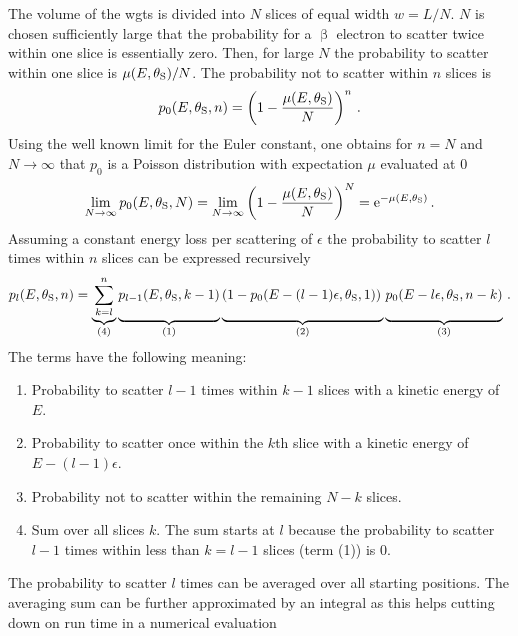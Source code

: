 The volume of the \gls{wgts} is divided into $N$ slices of equal width $w=L/N$. $N$ is chosen sufficiently large that the probability for a $\upbeta$ electron to scatter twice within one slice is essentially zero. Then, for large $N$ the probability to scatter within one slice is $\mu(E,\theta_\mathrm{S})/N$. The probability not to scatter within $n$ slices is
\begin{equation}
    p_0(E,\theta_\mathrm{S},n) =
    \left(
        1-\frac{\mu(E,\theta_\mathrm{S})}{N}
    \right)^n
    \text{\,.}
\end{equation}
Using the well known limit for the Euler constant, one obtains for $n=N$ and $N\rightarrow\infty$ that $p_0$ is a Poisson distribution with expectation $\mu$ evaluated at 0 
\begin{align}
    \lim_{N\rightarrow\infty} 
    p_0(E,\theta_\mathrm{S},N) =
    \lim_{N\rightarrow\infty} 
    \left(
        1-\frac{\mu(E,\theta_\mathrm{S})}{N}
    \right)^N =
    \mathrm{e}^{-\mu(E,\theta_\mathrm{S})}
    \text{\,.}
\end{align}
Assuming a constant energy loss per scattering of $\epsilon$ the probability to scatter $l$ times within $n$ slices can be expressed recursively
\begin{equation}
    p_l(E,\thetaSource,n) =
    \underbrace{
        \sum_{k=l}^{n}
    }_{(4)}
    \underbrace{
        p_{l-1}(E,\thetaSource,k-1)
        \vphantom{\sum_{k=l}^{n}}
    }_{(1)}
    \underbrace{
    \left(
        1-p_0(E-(l-1)\epsilon,\thetaSource,1)
    \right)
    \vphantom{\sum_{k=l}^{n}}
    }_{(2)}
    \underbrace{
        p_0(E-l\epsilon,\thetaSource,n-k)
        \vphantom{\sum_{k=l}^{n}}
    }_{(3)}
    \fullstop
\end{equation}
The terms have the following meaning:
\begin{enumerate}[(1)]
    \item Probability to scatter $l-1$ times within $k-1$ slices with a kinetic energy of $E$.
    \item Probability to scatter once within the $k$th slice with a kinetic energy of $E-(l-1)\epsilon$.
    \item Probability not to scatter within the remaining $N-k$ slices.
    \item Sum over all slices $k$. The sum starts at $l$ because the probability to scatter $l-1$ times within less than $k=l-1$ slices (term (1)) is 0.
\end{enumerate}
The probability to scatter $l$ times can be averaged over all starting positions. The averaging sum can be further approximated by an integral as this helps cutting down on run time in a numerical evaluation
